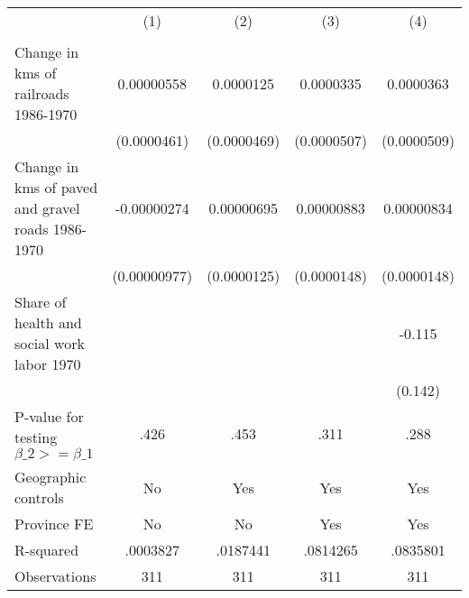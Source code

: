 {
\def\sym#1{\ifmmode^{#1}\else\(^{#1}\)\fi}
\begin{tabular}{l*{4}{c}}
\hline\hline
                &\multicolumn{1}{c}{(1)}&\multicolumn{1}{c}{(2)}&\multicolumn{1}{c}{(3)}&\multicolumn{1}{c}{(4)}\\
                &\multicolumn{1}{c}{}&\multicolumn{1}{c}{}&\multicolumn{1}{c}{}&\multicolumn{1}{c}{}\\
\hline
Change in kms of railroads 1986-1970&0.00000558         &0.0000125         &0.0000335         &0.0000363         \\
                &(0.0000461)         &(0.0000469)         &(0.0000507)         &(0.0000509)         \\
[1em]
Change in kms of paved and gravel roads 1986-1970&-0.00000274         &0.00000695         &0.00000883         &0.00000834         \\
                &(0.00000977)         &(0.0000125)         &(0.0000148)         &(0.0000148)         \\
[1em]
Share of health and social work labor 1970&                  &                  &                  &   -0.115         \\
                &                  &                  &                  &  (0.142)         \\
\hline
P-value for testing $\beta\_{2} >= \beta\_{1}$&     .426         &     .453         &     .311         &     .288         \\
Geographic controls&       No         &      Yes         &      Yes         &      Yes         \\
Province FE     &       No         &       No         &      Yes         &      Yes         \\
R-squared       & .0003827         & .0187441         & .0814265         & .0835801         \\
Observations    &      311         &      311         &      311         &      311         \\
\hline\hline
\end{tabular}
}
